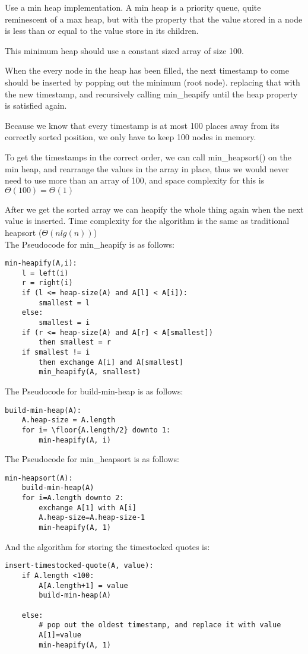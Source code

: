 \documentclass[12pt]{article}
\DeclarePairedDelimiter{\floor}{\lfloor}{\rfloor}
\newenvironment{question}[2][Question]{\begin{trivlist}
		\item[\hskip \labelsep {\bfseries #1}\hskip \labelsep {\bfseries #2.}]}{\end{trivlist}}
\begin{document}
\begin{question}{5}	
	
Use a min heap implementation. A min heap is a priority queue, quite reminescent of a max heap, but with the property that the value stored in a node is less than or equal to the value store in its children. 

This minimum heap should use a constant sized array of size 100. 

When the every node in the heap has been filled, the next timestamp to come should be inserted by popping out the minimum (root node). replacing that with the new timestamp, and recursively calling min\_heapify until the heap property is satisfied again. 

Because we know that every timestamp is at most 100 places away from its correctly sorted position, we only have to keep 100 nodes in memory. 

To get the timestamps in the correct order, we can call min\_heapsort() on the min heap, and rearrange the values in the array in place, thus we would never need to use more than an array of 100, and space complexity for this is $\Theta(100) = \Theta(1)$

After we get the sorted array we can heapify the whole thing again when the next value is inserted. Time complexity for the algorithm is the same as traditional heapsort ($\Theta(nlg(n))$)\\


The Pseudocode for min\_heapify is as follows:


\begin{lstlisting}
min-heapify(A,i):
	l = left(i)
	r = right(i)
	if (l <= heap-size(A) and A[l] < A[i]):
		smallest = l 
	else:
		smallest = i
	if (r <= heap-size(A) and A[r] < A[smallest])
		then smallest = r
	if smallest != i
		then exchange A[i] and A[smallest]
		min_heapify(A, smallest) 
\end{lstlisting}	
		
		The Pseudocode for build-min-heap is as follows:

\begin{lstlisting}
build-min-heap(A):
	A.heap-size = A.length
	for i= \floor{A.length/2} downto 1:
		min-heapify(A, i)					
		\end{lstlisting}	
						
The Pseudocode for min\_heapsort is as follows:

\begin{lstlisting}
min-heapsort(A):
	build-min-heap(A)
	for i=A.length downto 2:
		exchange A[1] with A[i]
		A.heap-size=A.heap-size-1
		min-heapify(A, 1)			
\end{lstlisting}	


And the algorithm for storing the timestocked quotes is:

\begin{lstlisting}
insert-timestocked-quote(A, value):
	if A.length <100:
		A[A.length+1] = value
		build-min-heap(A)
		
	else:
		# pop out the oldest timestamp, and replace it with value
		A[1]=value
		min-heapify(A, 1)
\end{lstlisting}	
	
\end{question}
	\clearpage
	
	
	
\end{document}
